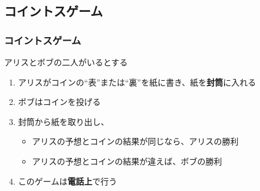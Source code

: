 \subsection{コイントスゲーム}
\begin{frame}[fragile]
  \frametitle{コイントスゲーム}

  \begin{exampleblock}{}
    アリスとボブの二人がいるとする
    \begin{enumerate}
      \item<2-> アリスがコインの``表''または``裏''を紙に書き、紙を\textbf{封筒}に入れる
      \item<3-> ボブはコインを投げる
      \item<4-> 封筒から紙を取り出し、
        \begin{itemize}
          \item アリスの予想とコインの結果が同じなら、アリスの勝利
          \item アリスの予想とコインの結果が違えば、ボブの勝利
        \end{itemize}
      \item<5-> このゲームは\textbf{電話上}で行う
    \end{enumerate}
  \end{exampleblock}

  \begin{center}

  \end{center}
\end{frame}

